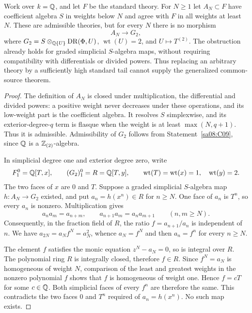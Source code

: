 \begin{proposition}\label{sa08:C13}
Work over $k=\mathbb Q$, and let $F$ be the standard theory. For $N\ge1$
let $A_N\subset F$ have coefficient algebra $S$ in weights below
$N$ and agree with $F$ in all weights at least $N$. These are
admissible theories, but for every $N$ there is no morphism
\[
 A_N\longrightarrow G_2,
\]
where $G_2=S\otimes_{\mathbb Q\{U\}}\mathrm{DR}(\Phi,U)$,
$\operatorname{wt}(U)=2$, and $U\mapsto T^{(2)}$.
The obstruction already holds for graded simplicial $S$-algebra
maps, without requiring compatibility with differentials or divided
powers. Thus replacing an arbitrary theory by a sufficiently high
standard tail cannot supply the generalized common-source theorem.
\end{proposition}
\begin{proof}
The definition of $A_N$ is closed under multiplication, the
differential and divided powers: a positive weight never decreases
under these operations, and its low-weight part is the coefficient
algebra. It resolves $S$ simplexwise, and its exterior-degree-$q$
term is flasque when the weight is at least $\max(N,q+1)$.
Thus it is admissible. Admissibility of $G_2$ follows from
Statement~\ref{sa08:C09}, since $\mathbb Q$ is a $\mathbb Z_{(2)}$-algebra.

In simplicial degree one and exterior degree zero, write
\[
 F_1^0=\mathbb Q[T,x],\qquad (G_2)_1^0=R=\mathbb Q[T,y],
 \qquad \operatorname{wt}(T)=\operatorname{wt}(x)=1,
 \quad\operatorname{wt}(y)=2.
\]
The two faces of $x$ are $0$ and $T$. Suppose a graded simplicial
$S$-algebra map $h:A_N\to G_2$ existed, and put
$a_n=h(x^n)\in R$ for $n\ge N$. One face of $a_n$ is $T^n$,
so every $a_n$ is nonzero. Multiplication gives
\[
 a_na_m=a_{n+m},\qquad
 a_{n+1}a_m=a_na_{m+1}\qquad(n,m\ge N).
\]
Consequently, in the fraction field of $R$, the ratio
$f=a_{n+1}/a_n$ is independent of $n$. We have
$a_{2N}=a_Nf^N=a_N^2$, whence $a_N=f^N$ and then $a_n=f^n$
for every $n\ge N$.

The element $f$ satisfies the monic equation $z^N-a_N=0$, so is
integral over $R$. The polynomial ring $R$ is integrally closed,
therefore $f\in R$. Since $f^N=a_N$ is homogeneous of weight $N$,
comparison of the least and greatest weights in the nonzero
polynomial $f$ shows that $f$ is homogeneous of weight one. Hence
$f=cT$ for some $c\in\mathbb Q$. Both simplicial faces of every $f^n$
are therefore the same. This contradicts the two faces $0$ and
$T^n$ required of $a_n=h(x^n)$. No such map exists.
\end{proof}
